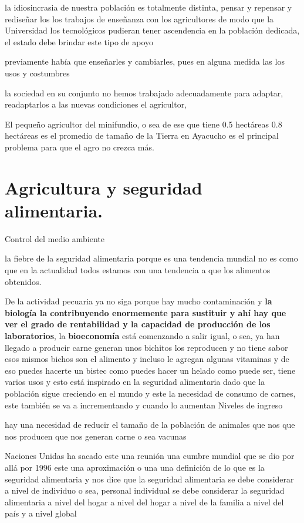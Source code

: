 \documentclass[
  a4paper,
]{article}
\begin{document}
la idiosincrasia de nuestra población es totalmente distinta, pensar y
repensar y rediseñar los los trabajos de enseñanza con los agricultores
de modo que la Universidad los tecnológicos pudieran tener ascendencia
en la población dedicada, el estado debe brindar este tipo de apoyo

previamente había que enseñarles y cambiarles, pues en alguna medida las
los usos y costumbres

la sociedad en su conjunto no hemos trabajado adecuadamente para
adaptar, readaptarlos a las nuevas condiciones el agricultor,

El pequeño agricultor del minifundio, o sea de ese que tiene 0.5
hectáreas 0.8 hectáreas es el promedio de tamaño de la Tierra en
Ayacucho es el principal problema para que el agro no crezca más.

\hypertarget{agricultura-y-seguridad-alimentaria.}{%
\section{Agricultura y seguridad
alimentaria.}\label{agricultura-y-seguridad-alimentaria.}}

Control del medio ambiente

la fiebre de la seguridad alimentaria porque es una tendencia mundial no
es como que en la actualidad todos estamos con una tendencia a que los
alimentos obtenidos.

De la actividad pecuaria ya no siga porque hay mucho contaminación y
\textbf{la biología la contribuyendo enormemente para sustituir y ahí
hay que ver el grado de rentabilidad y la capacidad de producción de los
laboratorios}, la \textbf{bioeconomía} está comenzando a salir igual, o
sea, ya han llegado a producir carne generan unos bichitos los
reproducen y no tiene sabor esos mismos bichos son el alimento y incluso
le agregan algunas vitaminas y de eso puedes hacerte un bistec como
puedes hacer un helado como puede ser, tiene varios usos y esto está
inspirado en la seguridad alimentaria dado que la población sigue
creciendo en el mundo y este la necesidad de consumo de carnes, este
también se va a incrementando y cuando lo aumentan Niveles de ingreso

hay una necesidad de reducir el tamaño de la población de animales que
nos que nos producen que nos generan carne o sea vacunas

Naciones Unidas ha sacado este una reunión una cumbre mundial que se dio
por allá por 1996 este una aproximación o una una definición de lo que
es la seguridad alimentaria y nos dice que la seguridad alimentaria se
debe considerar a nivel de individuo o sea, personal individual se debe
considerar la seguridad alimentaria a nivel del hogar a nivel del hogar
a nivel de la familia a nivel del país y a nivel global
\end{document}
